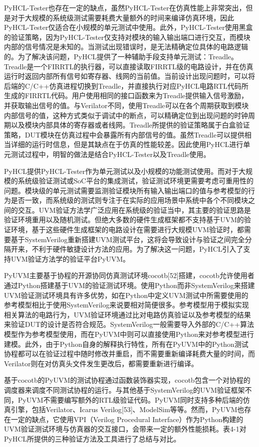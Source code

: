 PyHCL-Tester也存在一定的缺点，虽然PyHCL-Tester在仿真性能上非常突出，但是对于大规模的系统级测试需要耗费大量额外的时间来编译仿真环境，因此PyHCL-Tester仅适合在小规模的单元测试中使用。此外，PyHCL-Tester使用黑盒的验证策略，因为PyHCL-Tester仅支持对模块的输入输出端口进行交互，而模块内部的信号情况是未知的。当测试出现错误时，是无法精确定位具体的电路逻辑的。为了解决该问题，PyHCL提供了一种辅助手段支持单元测试：Treadle。Treadle是一个FIRRTL的执行器，可以直接读取FIRRTL级的电路设计，并在仿真运行时返回内部所有信号如寄存器、线网的当前值。当前设计出现问题时，可以将后端的C/C++仿真进程切换到Treadle，并直接执行对应PyHCL电路RTL代码所生成的FIRRTL代码。用户使用相同的接口函数来为Treadle提供输入信号激励，并获取输出信号的值。与Verilator不同，使用Treadle可以在各个周期获取到模块内部信号的值，这种方式类似于调试中的断点，可以精确定位到出现问题的时钟周期以及模块内部具体的寄存器或者线网。Treadle所提供的验证策略属于白盒验证策略，DUT模块在仿真过程中会暴露所有内部信号的值。虽然Treadle可以提供相当详细的运行时信息，但是其缺点在于仿真的性能较差。因此使用PyHCL进行单元测试过程中，明智的做法是结合PyHCL-Tester以及Treadle使用。

PyHCL提供PyHCL-Tester作为单元测试以及小规模的功能测试使用。而对于大规模的系统级验证测试或SoC平台的集成测试，验证测试环境更需要考虑可重用性的问题。模块级的单元测试需要监测验证模块所有输入输出端口的值与参考模型的行为是否一致，而系统级的测试则专注于在实际的应用场景中系统中各个不同模块之间的交互。UVM验证方法学广泛应用在系统级的验证当中，其主要的验证思路是验证环境重用以及随机测试。但绝大多数的硬件生成框架都不支持基于UVM的验证环境，基于这些硬件生成框架的电路设计在需要进行大规模UVM验证时，都需要基于SystemVerilog重新搭建UVM测试平台，这将会导致设计与验证之间完全分隔开来，不利于硬件敏捷设计方法的应用。为了解决这一问题，PyHCL引入了支持UVM验证方法学的验证平台PyUVM。

PyUVM主要基于协程的开源协同仿真测试环境cocotb[52]搭建，cocotb允许使用者通过Python搭建基于UVM的验证测试环境。使用Python而非SystemVerilog来搭建UVM验证测试环境具有许多优势，如在Python中定义UVM测试中所需要使用的参考模型相比于使用SystemVerilog来说要相对简便很多。参考模型用于模拟实现相关算法的电路行为，UVM验证环境通过比对电路仿真验证以及参考模型的结果来验证DUT的设计是否符合规范。SystemVerilog一般需要导入外部的C/C++算法模型作为参考模型使用，而在PyUVM中则可以直接使用Python来对参考模型进行建模。此外，由于Python自身的解释执行特性，所有在PyUVM中的Python测试协程都可以在验证过程中随时修改并重启，而不需要重新编译耗费大量的时间，而Verilator则在对仿真头文件发生更改后，都需要重新进行编译。

基于cocotb的PyUVM的测试协程通过函数装饰器实现，cocotb包含一个对协程的调度器来调度不同测试协程的运行。与其他基于SystemVerilog的UVM验证框架不同，PyUVM不需要编写额外的RTL级验证代码。PyUVM同时支持多种后端的仿真引擎，包括Verilator、Icarus Verilog[53]、ModelSim等等。然而，PyUVM也存在一定的缺点，它使用VPI（Verilog Procedural Interface）作为Python构建的UVM验证测试环境与仿真器的交互接口，会带来一定的额外性能损耗。表4-1对PyHCL所提供的三种验证方法及工具进行了总结与对比。

